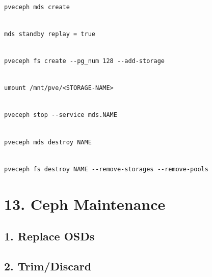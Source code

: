 \begin{lstlisting}

pveceph mds create

\end{lstlisting}

\begin{lstlisting}

mds standby replay = true

\end{lstlisting}

\begin{lstlisting}

pveceph fs create --pg_num 128 --add-storage

\end{lstlisting}

\begin{lstlisting}

umount /mnt/pve/<STORAGE-NAME>

\end{lstlisting}

\begin{lstlisting}

pveceph stop --service mds.NAME

\end{lstlisting}

\begin{lstlisting}

pveceph mds destroy NAME

\end{lstlisting}

\begin{lstlisting}

pveceph fs destroy NAME --remove-storages --remove-pools

\end{lstlisting}


\section{13. Ceph Maintenance}

\subsection{1. Replace OSDs}

\subsection{2. Trim/Discard}

